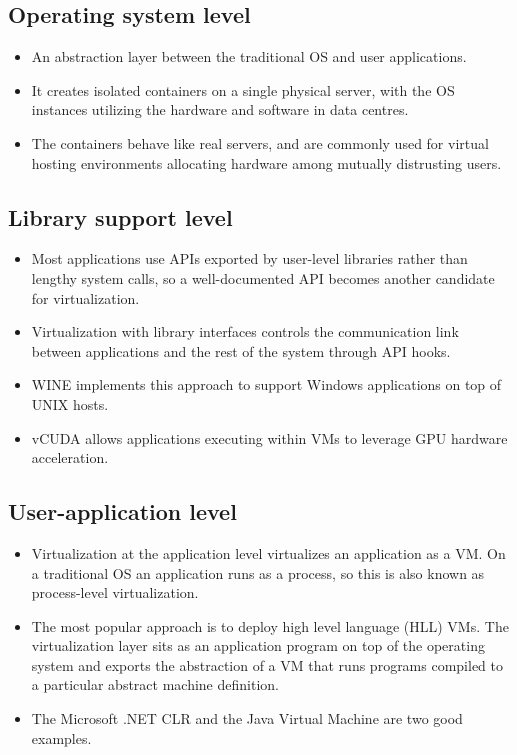 \documentclass[11pt,a4paper]{article}
\begin{document}
\subsection{Operating system level}

\begin{itemize}\itemsep2pt
  \item An abstraction layer between the traditional OS and user applications.
  \item It creates isolated containers on a single physical server, with the OS instances
        utilizing the hardware and software in data centres.
  \item The containers behave like real servers, and are commonly used for virtual hosting
        environments allocating hardware among mutually distrusting users.
\end{itemize}

\subsection{Library support level}

\begin{itemize}\itemsep2pt
  \item Most applications use APIs exported by user-level libraries rather than lengthy system
        calls, so a well-documented API becomes another candidate for virtualization.
  \item Virtualization with library interfaces controls the communication link between
        applications and the rest of the system through API hooks.
  \item WINE implements this approach to support Windows applications on top of UNIX hosts.
  \item vCUDA allows applications executing within VMs to leverage GPU hardware acceleration.
\end{itemize}

\subsection{User-application level}

\begin{itemize}\itemsep2pt
  \item Virtualization at the application level virtualizes an application as a VM. On a
        traditional OS an application runs as a process, so this is also known as
        process-level virtualization.
  \item The most popular approach is to deploy high level language (HLL) VMs. The
        virtualization layer sits as an application program on top of the operating system and
        exports the abstraction of a VM that runs programs compiled to a particular abstract
        machine definition.
  \item The Microsoft .NET CLR and the Java Virtual Machine are two good examples.
\end{itemize}
\end{document}

